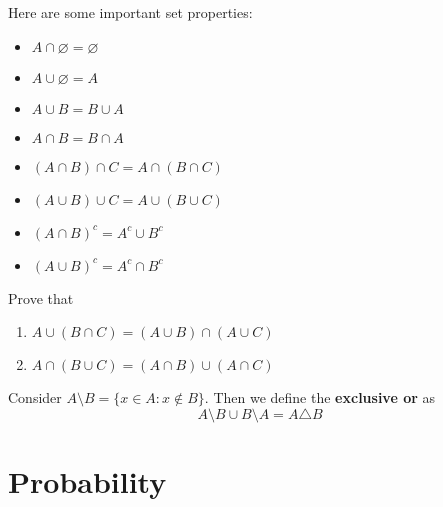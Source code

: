 \documentclass{article}
\begin{document}
\pagebreak
Here are some important set properties:
	\begin{multicols}{2}
		\begin{itemize}
			\item $A \cap \varnothing = \varnothing$
			\item $A \cup \varnothing = A$
			\item $A \cup B = B \cup A$
			\item $A \cap B = B \cap A$
			\item $(A\cap B)\cap C = A \cap (B \cap C)$
			\item $(A \cup B) \cup C = A \cup (B \cup C)$
			\item $(A \cap B)^c = A^c \cup B^c$
			\item $(A \cup B)^c = A^c \cap B^c$
		\end{itemize}
	\end{multicols}
	\begin{exe}
		Prove that
		\begin{enumerate}
			\item $A \cup (B \cap C) = (A \cup B) \cap (A \cup C)$
			\item $A \cap (B \cup C) = (A \cap B) \cup (A \cap C)$
		\end{enumerate}
	\end{exe}
	\begin{note}
		Consider $A \setminus B = \{ x\in A: x \notin B \}$. Then we define the \textbf{exclusive or} as
		$$ A \setminus B \cup B \setminus A = A \triangle B$$
	\end{note}
\pagebreak
\section{Probability}
\end{document}
